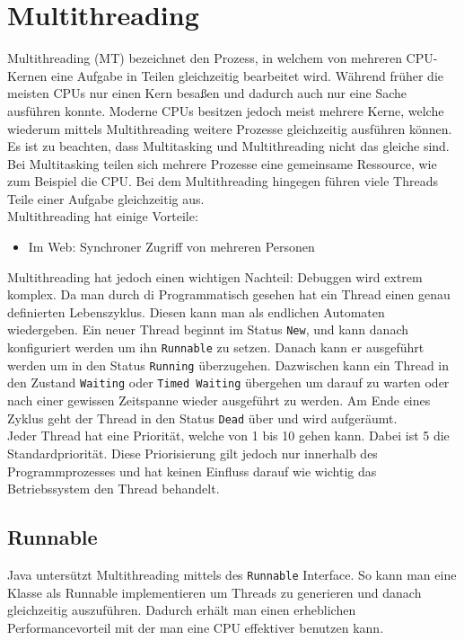 \documentclass{article}
\begin{document}
	\section{Multithreading}
	Multithreading (MT) bezeichnet den Prozess, in welchem von mehreren CPU-Kernen eine Aufgabe in Teilen gleichzeitig bearbeitet wird. Während früher die meisten CPUs nur einen Kern besaßen und dadurch auch nur eine Sache ausführen konnte. Moderne CPUs besitzen jedoch meist mehrere Kerne, welche wiederum mittels Multithreading weitere Prozesse gleichzeitig ausführen können. \\
	Es ist zu beachten, dass Multitasking und Multithreading nicht das gleiche sind. Bei Multitasking teilen sich mehrere Prozesse eine gemeinsame Ressource, wie zum Beispiel die CPU. Bei dem Multithreading hingegen führen viele Threads Teile einer Aufgabe gleichzeitig aus. \\
	Multithreading hat einige Vorteile:
	\begin{itemize}

		\item{Im Web: Synchroner Zugriff von mehreren Personen}
	\end{itemize}
	Multithreading hat jedoch einen wichtigen Nachteil: Debuggen wird extrem komplex. Da man durch di
	Programmatisch gesehen hat ein Thread einen genau definierten Lebenszyklus. Diesen kann man als endlichen Automaten wiedergeben. Ein neuer Thread beginnt im Status \texttt{New}, und kann danach konfiguriert werden um ihn \texttt{Runnable} zu setzen. Danach kann er ausgeführt werden um in den Status \texttt{Running} überzugehen. Dazwischen kann ein Thread in den Zustand \texttt{Waiting} oder \texttt{Timed Waiting} übergehen um darauf zu warten oder nach einer gewissen Zeitspanne wieder ausgeführt zu werden. Am Ende eines Zyklus geht der Thread in den Status \texttt{Dead} über und wird aufgeräumt. \\
	Jeder Thread hat eine Priorität, welche von 1 bis 10 gehen kann. Dabei ist 5 die Standardpriorität. Diese Priorisierung gilt jedoch nur innerhalb des Programmprozesses und hat keinen Einfluss darauf wie wichtig das Betriebssystem den Thread behandelt.
	\subsection{Runnable}
	Java untersützt Multithreading mittels des \texttt{Runnable} Interface. So kann man eine Klasse als Runnable implementieren um Threads zu generieren und danach gleichzeitig auszuführen. Dadurch erhält man einen erheblichen Performancevorteil mit der man eine CPU effektiver benutzen kann.
\end{document}
